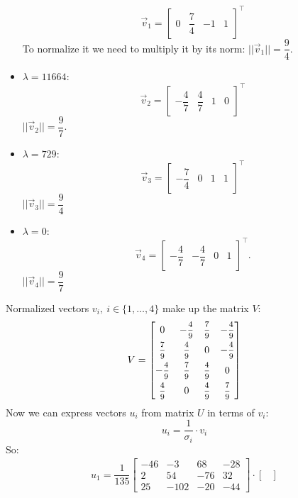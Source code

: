 \documentclass[12pt]{report}
\begin{document}
\begin{solution}
\begin{itemize}
      \[
         \vec{v}_1 = \begin{bmatrix}
            0 & \dfrac{7}{4} & -1 & 1
         \end{bmatrix}^\intercal
      \]
      To normalize it we need to multiply it by its norm: $||\vec{v}_1|| = \dfrac{9}{4}$.
      \item $\lambda = 11664$:
      \[
         \vec{v}_2 = \begin{bmatrix}
            -\dfrac{4}{7} & \dfrac{4}{7} & 1 & 0
         \end{bmatrix}^\intercal
      \]
      $||\vec{v}_2|| = \dfrac{9}{7}$.
      \item $\lambda = 729$:
      \[
         \vec{v}_3 = \begin{bmatrix}
            -\dfrac{7}{4} & 0 & 1 & 1
         \end{bmatrix}^\intercal 
      \]
      $||\vec{v}_3|| = \dfrac{9}{4}$
      \item $\lambda = 0$:
      \[
         \vec{v}_4 = \begin{bmatrix}
            -\dfrac{4}{7} & -\dfrac{4}{7} & 0 & 1
         \end{bmatrix}^\intercal.
      \]
      $||\vec{v}_4|| = \dfrac{9}{7}$
    \end{itemize}
    Normalized vectors $v_i, \ i \in \{1, \ldots, 4\}$ make up the matrix $V$:
    \[
         V = \begin{bmatrix}
            0 & -\medmath{\dfrac{4}{9}} & \medmath{\dfrac{7}{9}} & -\medmath{\dfrac{4}{9}} \\[0.2cm]
            \medmath{\dfrac{7}{9}} & \medmath{\dfrac{4}{9}} & 0 & -\medmath{\dfrac{4}{9}} \\[0.2cm]
            -\medmath{\dfrac{4}{9}} & \medmath{\dfrac{7}{9}} & \medmath{\dfrac{4}{9}} & 0 \\[0.2cm]
            \medmath{\dfrac{4}{9}} & 0 & \medmath{\dfrac{4}{9}} & \medmath{\dfrac{7}{9}}
         \end{bmatrix}
    \]
    Now we can express vectors $u_i$ from matrix $U$ in terms of $v_i$:
    \[
         u_i = \dfrac{1}{\sigma_i} \cdot v_i
    \]
    So:
    \[
         \begin{array}{c}
            u_1 = \dfrac{1}{135} \begin{bmatrix}
               -46 & -3 & 68 & -28\\
               2 & 54 & -76 & 32 \\
               25 & -102 & -20 & -44 
            \end{bmatrix} \cdot \begin{bmatrix}

\end{bmatrix}
\end{array}\]
\end{solution}
\end{document}
